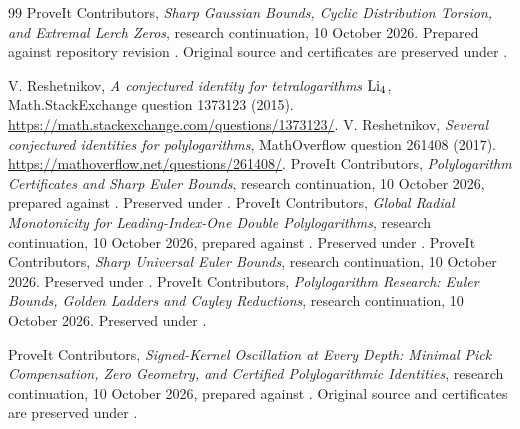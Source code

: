 \begin{thebibliography}{99}
ProveIt Contributors, \emph{Sharp Gaussian Bounds, Cyclic Distribution
Torsion, and Extremal Lerch Zeros}, research continuation, 10 October 2026.
Prepared against repository revision .
Original source and certificates are preserved under
.


V. Reshetnikov, \emph{A conjectured identity for tetralogarithms $\operatorname{Li}_4$},
Math.StackExchange question 1373123 (2015).
\url{https://math.stackexchange.com/questions/1373123/}.
V. Reshetnikov, \emph{Several conjectured identities for polylogarithms},
MathOverflow question 261408 (2017).
\url{https://mathoverflow.net/questions/261408/}.
ProveIt Contributors, \emph{Polylogarithm Certificates and Sharp Euler Bounds},
research continuation, 10 October 2026, prepared against .
Preserved under
.
ProveIt Contributors, \emph{Global Radial Monotonicity for Leading-Index-One
Double Polylogarithms}, research continuation, 10 October 2026,
prepared against .
Preserved under
.
ProveIt Contributors, \emph{Sharp Universal Euler Bounds},
research continuation, 10 October 2026.
Preserved under
.
ProveIt Contributors, \emph{Polylogarithm Research: Euler Bounds, Golden
Ladders and Cayley Reductions}, research continuation, 10 October 2026.
Preserved under
.


ProveIt Contributors, \emph{Signed-Kernel Oscillation at Every Depth:
Minimal Pick Compensation, Zero Geometry, and Certified Polylogarithmic
Identities}, research continuation, 10 October 2026, prepared against
.
Original source and certificates are preserved under
.


\end{thebibliography}
